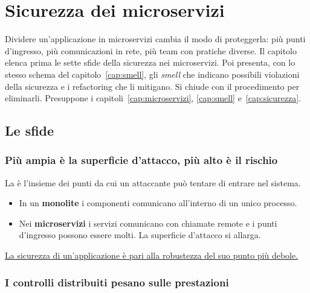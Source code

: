 \chapter{Sicurezza dei microservizi}
\label{cap:sicurezza-micro}

\begin{inbreve}
Dividere un'applicazione in microservizi cambia il modo di proteggerla: più punti d'ingresso, più comunicazioni in
rete, più team con pratiche diverse. Il capitolo elenca prima le sette sfide della sicurezza nei microservizi. Poi
presenta, con lo stesso schema del capitolo~\ref{cap:smell}, gli \emph{smell} che indicano possibili violazioni della
sicurezza e i refactoring che li mitigano. Si chiude con il procedimento per eliminarli. Presuppone i
capitoli~\ref{cap:microservizi}, \ref{cap:smell} e~\ref{cap:sicurezza}.
\end{inbreve}

\section{Le sfide}
\label{sec:secm-sfide}

\subsection{Più ampia è la superficie d'attacco, più alto è il rischio}

La  è l'insieme dei punti da cui un attaccante può tentare di entrare nel sistema.
\begin{itemize}
  \item In un \textbf{monolite} i componenti comunicano all'interno di un unico processo.
  \item Nei \textbf{microservizi} i servizi comunicano con chiamate remote e i punti d'ingresso possono essere molti.
    La superficie d'attacco si allarga.
\end{itemize}
\uline{La sicurezza di un'applicazione è pari alla robustezza del suo punto più debole.}

\subsection{I controlli distribuiti pesano sulle prestazioni}

